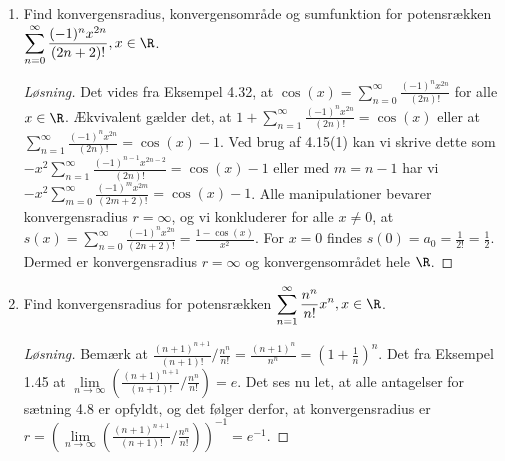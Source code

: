 \begin{opg}
\begin{enumerate}
		\item Find konvergensradius,  konvergensomr\aa{}de  og sumfunktion for potensrækken $\displaystyle \sum_{n=0}^{\infty}\frac{(-1)^nx^{2n}}{(2n+2)!} ,  x\in\R $. 
		\ifanswers
		\begin{proof}[Løsning]
		Det vides fra Eksempel 4.32, at $ \cos(x)=\sum_{n=0}^{\infty}\frac{(-1)^nx^{2n}}{(2n)!} $ for alle $ x\in \R $. Ækvivalent gælder det, at $ 1+\sum_{n=1}^{\infty}\frac{(-1)^nx^{2n}}{(2n)!}=\cos(x)  $ eller at $ \sum_{n=1}^{\infty}\frac{(-1)^nx^{2n}}{(2n)!}=\cos(x)-1 $. Ved brug af 4.15(1) kan vi skrive dette som $ -x^{2}\sum_{n=1}^{\infty}\frac{(-1)^{n-1}x^{2n-2}}{(2n)!}=\cos(x)-1 $ eller med $ m=n-1 $ har vi $ -x^{2}\sum_{m=0}^{\infty}\frac{(-1)^{m}x^{2m}}{(2m+2)!}=\cos(x)-1 $. 
		Alle manipulationer bevarer konvergensradius $ r=\infty $, og vi konkluderer for alle $ x\neq 0 $, at $ s(x)=\sum_{n=0}^{\infty}\frac{(-1)^{n}x^{2n}}{(2n+2)!}=\frac{1-\cos(x)}{x^2} $. For $ x=0 $ findes $ s(0)=a_0=\frac{1}{2!}=\frac{1}{2} $. Dermed er konvergensradius $ r=\infty $ og konvergensområdet hele $ \R $.
		\end{proof}
		\fi
		
		\item Find konvergensradius for potensrækken $\displaystyle \sum_{n=1}^{\infty}\frac{n^n}{n!}x^n, x\in\R $.
		\ifanswers
		\begin{proof}[Løsning]
			Bemærk at $ \frac{(n+1)^{n+1}}{(n+1)!}\Big/ \frac{n^n}{n!}=\frac{(n+1)^n}{n^n}=\left(1+\frac{1}{n}\right)^n $. Det fra Eksempel 1.45 at $ \lim\limits_{n\to\infty}\left(\frac{(n+1)^{n+1}}{(n+1)!}\Big/ \frac{n^n}{n!}\right)=e $.
			Det ses nu let, at alle antagelser for sætning 4.8 er opfyldt, og det følger derfor, at konvergensradius er $ r=\left(\lim\limits_{n\to\infty}\left(\frac{(n+1)^{n+1}}{(n+1)!}\Big/ \frac{n^n}{n!}\right)\right)^{-1}=e^{-1}  $.
		\end{proof}
		\fi
	\end{enumerate}
\end{opg}



